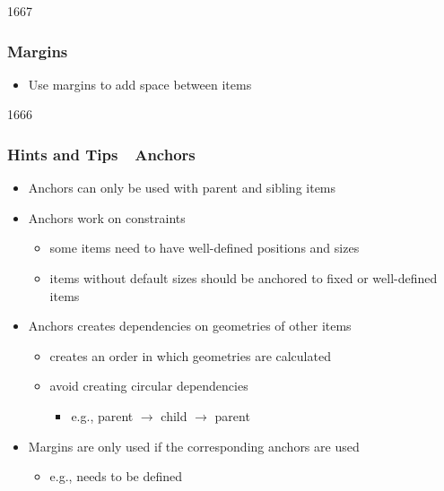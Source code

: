 
\begin{slide}{1667}\frametitle{Margins}


\begin{itemize}
\item Use margins to add space between items
\end{itemize}
\end{slide}


\begin{slide}{1666}\frametitle{Hints and Tips~\textendash~Anchors}

\begin{itemize}
\item Anchors can only be used with parent and sibling items
\item Anchors work on constraints
  \begin{itemize}
  \item some items need to have well-defined positions and sizes
  \item items without default sizes should be anchored to fixed or well-defined items
  \end{itemize}
\item Anchors creates dependencies on geometries of other items
  \begin{itemize}
  \item creates an order in which geometries are calculated
  \item avoid creating circular dependencies
    \begin{itemize}
    \item e.g., parent $\rightarrow$ child $\rightarrow$ parent
    \end{itemize}
  \end{itemize}
\item Margins are only used if the corresponding anchors are used
  \begin{itemize}
  \item e.g.,  needs  to be defined
  \end{itemize}
\end{itemize}

\end{slide}

